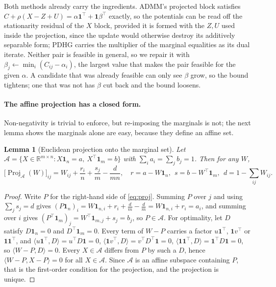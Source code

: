 \documentclass{article}
\newtheorem{lemma}{Lemma}
\newcommand{\R}{\mathbb{R}}
\newcommand{\Proj}{\operatorname{Proj}}
\begin{document}
Both methods already carry the ingredients. ADMM's projected block satisfies
$C+\rho(X-Z+U)=\alpha\mathbf 1^\top+\mathbf 1\beta^\top$ exactly, so the potentials can be
read off the stationarity residual of the $X$ block, provided it is formed with the $Z,U$
used inside the projection, since the update would otherwise destroy its additively
separable form; PDHG carries the multiplier of the marginal equalities as its dual
iterate. Neither pair is feasible in general, so we repair it with
$\beta_j\leftarrow\min_i(C_{ij}-\alpha_i)$, the largest value that makes the pair feasible
for the given $\alpha$. A candidate that was already feasible can only see $\beta$ grow,
so the bound tightens; one that was not has $\beta$ cut back and the bound loosens.

\paragraph{The affine projection has a closed form.}
Non-negativity is trivial to enforce, but re-imposing the marginals is not; the next
lemma shows the marginals alone are easy, because they define an affine set.

\begin{lemma}[Euclidean projection onto the marginal set]
\label{lem:projection}
Let $\mathcal A=\{X\in\R^{m\times n}: X\mathbf 1_n=a,\ X^\top\mathbf 1_m=b\}$ with
$\sum_i a_i=\sum_j b_j=1$. Then for any $W$,
\begin{equation}
\label{eq:proj}
\bigl[\Proj_{\mathcal A}(W)\bigr]_{ij}
=W_{ij}+\frac{r_i}{n}+\frac{s_j}{m}-\frac{d}{mn},
\quad
r=a-W\mathbf 1_n,\ \ s=b-W^\top\mathbf 1_m,\ \ d=1-\textstyle\sum_{ij}W_{ij}.
\end{equation}
\end{lemma}
\begin{proof}
Write $P$ for the right-hand side of \eqref{eq:proj}. Summing $P$ over $j$ and
using $\sum_j s_j=d$ gives
$(P\mathbf 1_n)_i=W\mathbf 1_{n,i}+r_i+\tfrac{d}{m}-\tfrac{d}{m}=W\mathbf 1_{n,i}+r_i=a_i$,
and summing over $i$ gives $(P^\top\mathbf 1_m)_j=W^\top\mathbf 1_{m,j}+s_j=b_j$, so
$P\in\mathcal A$. For optimality, let $D$ satisfy $D\mathbf 1_n=0$ and
$D^\top\mathbf 1_m=0$. Every term of $W-P$ carries a factor $u\mathbf 1^\top$,
$\mathbf 1 v^\top$ or $\mathbf 1\mathbf 1^\top$, and
$\langle u\mathbf 1^\top,D\rangle=u^\top D\mathbf 1=0$,
$\langle \mathbf 1 v^\top,D\rangle=v^\top D^\top\mathbf 1=0$,
$\langle \mathbf 1\mathbf 1^\top,D\rangle=\mathbf 1^\top D\mathbf 1=0$, so
$\langle W-P,D\rangle=0$. Every $X\in\mathcal A$ differs from $P$ by such a $D$, hence
$\langle W-P,X-P\rangle=0$ for all $X\in\mathcal A$. Since $\mathcal A$ is an affine
subspace containing $P$, that is the first-order condition for the projection, and the
projection is unique.
\end{proof}
\end{document}
